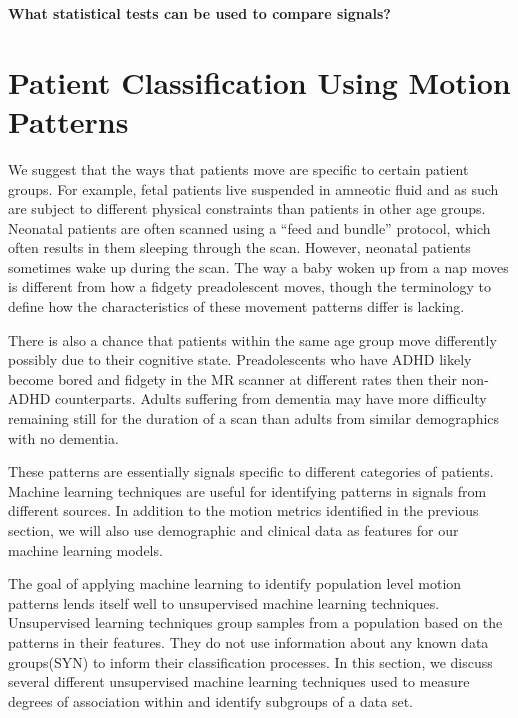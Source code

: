 \textbf{What statistical tests can be used to compare signals?}

\section{Patient Classification Using Motion Patterns} 


We suggest that the ways that patients move are specific to certain patient groups. For example, fetal patients live suspended in amneotic fluid and as such are subject to different physical constraints than patients in other age groups. Neonatal patients are often scanned using a ``feed and bundle'' protocol, which often results in them sleeping through the scan. However, neonatal patients sometimes wake up during the scan. The way a baby woken up from a nap moves is different from how a fidgety preadolescent moves, though the terminology to define how the characteristics of these movement patterns differ is lacking. 

There is also a chance that patients within the same age group move differently possibly due to their cognitive state. Preadolescents who have ADHD likely become bored and fidgety in the MR scanner at different rates then their non-ADHD counterparts. Adults suffering from dementia may have more difficulty remaining still for the duration of a scan than adults from similar demographics with no dementia.

These patterns are essentially signals specific to different categories of patients. Machine learning techniques are useful for identifying patterns in signals from different sources. In addition to the motion metrics identified in the previous section, we will also use demographic and clinical data as features for our machine learning models. 

The goal of applying machine learning to identify population level motion patterns lends itself well to unsupervised machine learning techniques. Unsupervised learning techniques group samples from a population based on the patterns in their features. They do not use information about any known data groups(SYN) to inform their classification processes. In this section, we discuss several different unsupervised machine learning techniques used to measure degrees of association within and identify subgroups of a data set.

